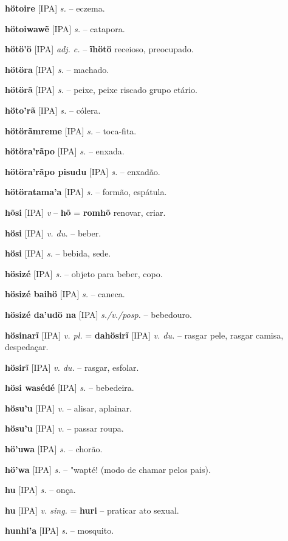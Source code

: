 \textbf{hötoire} [IPA] \textit{s.} -- eczema.

\textbf{hötoiwawẽ} [IPA] \textit{s.} -- catapora.

\textbf{hötö'ö} [IPA] \textit{adj. c.} -- \textbf{ĩhötö} receioso, preocupado.

\textbf{hötöra} [IPA] \textit{s.} -- machado.

\textbf{hötörã} [IPA] \textit{s.} -- peixe, peixe riscado  grupo etário.

\textbf{höto'rã} [IPA] \textit{s.} -- cólera.

\textbf{hötörãmreme} [IPA] \textit{s.} -- toca-fita.

\textbf{hötöra'rãpo} [IPA] \textit{s.} -- enxada.

\textbf{hötöra'rãpo pisudu} [IPA] \textit{s.} -- enxadão.

\textbf{hötöratama'a} [IPA] \textit{s.} -- formão, espátula.

\textbf{hõsi} [IPA] \textit{v} -- \textbf{hõ} = \textbf{romhõ} renovar, criar.

\textbf{hösi} [IPA] \textit{v. du.} -- beber.

\textbf{hösi} [IPA] \textit{s.} -- bebida, sede.

\textbf{hösizé} [IPA] \textit{s.} -- objeto para beber, copo.

\textbf{hösizé baihö} [IPA] \textit{s.} -- caneca.

\textbf{hösizé da'udö na} [IPA] \textit{s./v./posp.} -- bebedouro.

\textbf{hösinarĩ} [IPA] \textit{v. pl.} = \textbf{dahösirĩ} [IPA] \textit{v. du.} -- rasgar pele, rasgar camisa, despedaçar.

\textbf{hösirĩ} [IPA] \textit{v. du.} -- rasgar, esfolar.

\textbf{hösi wasédé} [IPA] \textit{s.} -- bebedeira.

\textbf{hösu'u} [IPA] \textit{v.} -- alisar, aplainar.

\textbf{hösu'u} [IPA] \textit{v.} -- passar roupa.

\textbf{hö'uwa} [IPA] \textit{s.} -- chorão.

\textbf{hö'wa} [IPA] \textit{s.} -- "wapté! (modo de chamar pelos pais).

\textbf{hu} [IPA] \textit{s.} -- onça.

\textbf{hu} [IPA] \textit{v. sing.} = \textbf{huri} -- praticar ato sexual.

\textbf{hunhi'a} [IPA] \textit{s.} -- mosquito.

